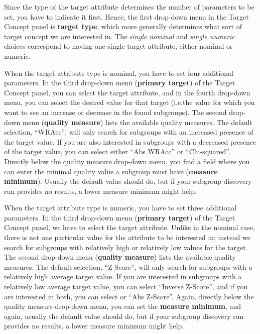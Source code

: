 \documentclass{article}
\begin{document}
Since the \gls{type} of the target attribute determines the number of
parameters to be set, you have to indicate it first.  Hence, the first
drop-down menu in the Target Concept panel is {\bf target type}, which more
generally determines what sort of target concept we are interested in.  The
\emph{single nominal} and \emph{single numeric} choices correspond to having
one single target attribute, either nominal or numeric.

When the target attribute type is \gls{nominal}, you have to set four
additional parameters.  In the third drop-down menu (\textbf{primary
target}) of the Target Concept panel, you can select the target attribute,
and in the fourth drop-down menu, you can select the desired value for that
target (i.e.\@ the value for which you want to see an increase or
decrease in the found subgroups).  
The second drop-down menu (\textbf{quality measure}) lists the available
quality measures.  The default selection, ``WRAcc'', will only search for
subgroups with an increased presence of the target value.  If you are also
interested in subgroups with a decreased presence of the target value, you
can select either ``Abs WRAcc'' or ``Chi-squared''. Directly below the
quality measure drop-down menu, you find a field where you can enter the
minimal quality value a subgroup must have (\textbf{measure minimum}).
Usually the default value should do, but if your subgroup discovery run
provides no results, a lower measure minimum might help.

When the target attribute type is \gls{numeric}, you have to set three
additional parameters.  In the third drop-down menu (\textbf{primary
target}) of the Target Concept panel, we have to select the target
attribute.  Unlike in the nominal case, there is not one particular value
for the attribute to be interested in; instead we search for subgroups with
relatively high or relatively low values for the target.  The second
drop-down menu (\textbf{quality measure}) lists the available quality
measures.  The default selection, ``Z-Score'', will only search for
subgroups with a relatively high average target value.  If you are
interested in subgroups with a relatively low average target value, you can
select ``Inverse Z-Score'', and if you are interested in both, you can
select or ``Abs Z-Score''.  Again, directly below the quality measure
drop-down menu, you can set the \textbf{measure minimum}, and again, usually
the default value should do, but if your subgroup discovery run provides no
results, a lower measure minimum might help.
\end{document}
